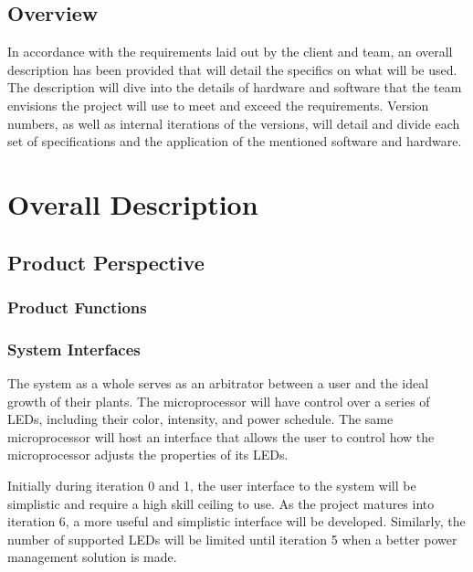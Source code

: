 \documentclass[onecolumn, draftclsnofoot,10pt, compsoc]{IEEEtran}
\begin{document}
		\subsection*{Overview}
		In accordance with the requirements laid out by the client and team, an overall description has been provided that will detail the specifics on what will be used.  The description will dive into
		the details of hardware and software that the team envisions the project will use to meet and exceed the requirements.  Version numbers, as well as internal iterations of the versions, will detail
		and divide each set of specifications and the application of the mentioned software and hardware.


	\section*{Overall Description}
		\subsection*{Product Perspective}

		\subsubsection*{Product Functions}

				\subsubsection{System Interfaces}
				The system as a whole serves as an arbitrator between a user and the ideal growth of their plants.
				The microprocessor will have control over a series of LEDs, including their color, intensity, and power schedule. The same microprocessor will host an interface that allows the user to control
				how the microprocessor adjusts the properties of its LEDs.

				Initially during iteration 0 and 1, the user interface to the system will be simplistic and require a high skill ceiling to use. As the project matures into iteration 6, a more useful and
				simplistic interface will be developed. Similarly, the number of supported LEDs will be limited until iteration 5 when a better power management solution is made.
\end{document}
